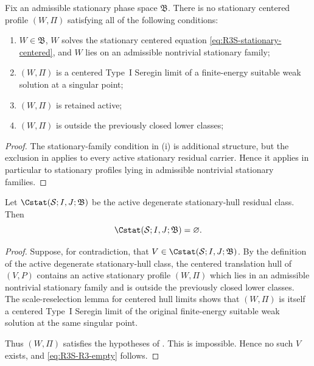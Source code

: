 \begin{corollary}
\label{cor:R3S-no-active-degenerate-family}
Fix an admissible stationary phase space \(\mathfrak B\).  There is no stationary
centered profile \((W,\Pi)\) satisfying all of the following conditions:
\begin{enumerate}[label=(\roman*)]
   \item \(W\in\mathfrak B\), \(W\) solves the stationary centered equation
   \eqref{eq:R3S-stationary-centered}, and \(W\) lies on an admissible
   nontrivial stationary family;
   \item \((W,\Pi)\) is a centered Type~I Seregin limit of a finite-energy
   suitable weak solution at a singular point;
   \item \((W,\Pi)\) is retained active;
   \item \((W,\Pi)\) is outside the previously closed lower classes;
\end{enumerate}
\end{corollary}

\begin{proof}
The stationary-family condition in (i) is additional structure, but the exclusion in
 applies to every active stationary
residual carrier.  Hence it applies in particular to stationary profiles lying
in admissible nontrivial stationary families.
\end{proof}

\begin{theorem}
\label{thm:R3S-R3-empty}
Let \(\Cstat(\mathcal S;I,J;\mathfrak B)\) be the active
degenerate stationary-hull residual class.  Then
\begin{equation}\label{eq:R3S-R3-empty}
   \Cstat(\mathcal S;I,J;\mathfrak B)=\varnothing .
\end{equation}
\end{theorem}

\begin{proof}
Suppose, for contradiction, that
\(V\in\Cstat(\mathcal S;I,J;\mathfrak B)\).  By the
definition of the active degenerate stationary-hull class, the centered
translation hull of \((V,P)\) contains an active stationary profile \((W,\Pi)\)
which lies in an admissible nontrivial stationary family and is outside the
previously closed lower classes.  The scale-reselection lemma for centered hull
limits shows that \((W,\Pi)\) is itself a centered Type~I Seregin limit of the
original finite-energy suitable weak solution at the same singular point.

Thus \((W,\Pi)\) satisfies the hypotheses of
.  This is impossible.  Hence no such
\(V\) exists, and \eqref{eq:R3S-R3-empty} follows.
\end{proof}

